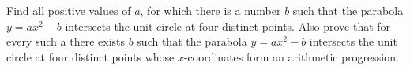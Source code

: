 Find all positive values of $a$, for which there is a number $b$ such that the parabola $y=ax^2-b$ intersects the unit circle at four distinct points. Also prove that for every such a there exists $b$ such that the parabola $y=ax^2-b$ intersects the unit circle at four distinct points whose $x$-coordinates form an arithmetic progression.